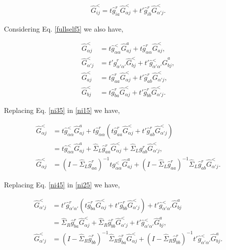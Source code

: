 \documentclass[10pt,prb,showpacs,amssymb,floatfix]{revtex4-1}
\newcommand{\nn}{\nonumber}
\newcommand{\alp}{\alpha}
\newcommand{\Sg}{\Sigma}
\newcommand{\h}{\hat}
\begin{document}
 
  \begin{align}
  \label{Fij5}
 \h G^<_{ij} =   t \h g^r_{ia} \h G^<_{\alp j}  +t' \h g^r_{ib}\h G^<_{\alp' j}. 
   \end{align}
 
Considering Eq. \eqref{fullself5} we also have,

  \begin{align}
  \label{ni15}
 \h G^<_{\alp j} &=   t \h g^<_{\alp\alp} \h{G}^a_{a j}  +t \h g^r_{\alp\alp}\h G^<_{a j}, \\
    \label{ni25}
   \h G^<_{\alp' j} &=   t' \h g^r_{\alp'\alp'} \h{G}^<_{b j}  +t' \h g^<_{\alp'\alp'}\h{G}^a_{b j}, \\
    \label{ni35}
    \h G^<_{a j} &=   t \h g^r_{a a} \h{G}^<_{\alp j}  +t' \h g^r_{a b}\h G^<_{\alp' j}, \\
      \label{ni45}
      \h G^<_{b j} &=   t \h g^r_{b a} \h{G}^<_{\alp j}  +t' \h g^r_{b b}\h G^<_{\alp' j}. 
   \end{align}
 
Replacing Eq. \eqref{ni35} in \eqref{ni15} we have,

\begin{align}
\label{ni55}
\h G^<_{\alp j} &=   t \h g^<_{\alp\alp} \h{G}^a_{a j}  +t \h g^r_{\alp\alp}(t \h g^r_{a a} \h{G}^<_{\alp j}  +t' \h g^r_{a b}\h G^<_{\alp' j}) \nn\\
&= t \h g^<_{\alp\alp} \h{G}^a_{a j}  + \h \Sg_{L} \h g^r_{a a} \h{G}^<_{\alp j}  +\h \Sg_{L} g^r_{a b}\h G^<_{\alp' j}, \nn\\
\h G^<_{\alp j} &= (I-\h \Sg_L \h g^r_{aa})^{-1} t g^<_{\alp\alp} \h{G}^a_{aj} + (I-\h \Sg_L \h g^r_{aa})^{-1} \h \Sg_L \h g^r_{ab} \h G^<_{\alp' j}.
\end{align}

Replacing Eq.  \eqref{ni45} in \eqref{ni25} we have,

\begin{align}
\label{ni65}
\h G^<_{\alp' j} &=   t' \h g^r_{\alp'\alp'} ( t \h g^r_{b a} \h{G}^<_{\alp j}  +t' \h g^r_{b b}\h G^<_{\alp' j} ) +t' \h g^<_{\alp'\alp'}\h{G}^a_{b j} \nn\\
&= \h \Sg_R  \h g^r_{b a} \h{G}^<_{\alp j} + \h \Sg_R  \h g^r_{b b}\h G^<_{\alp' j}+t' \h g^<_{\alp'\alp'}\h{G}^a_{b j}, \nn\\
\h G^<_{\alp' j} &= (I- \h \Sg_R  \h g^r_{b b})^{-1}\h \Sg_R  \h g^r_{b a} \h{G}^<_{\alp j} + (I- \h \Sg_R  \h g^r_{b b})^{-1}t' \h g^<_{\alp'\alp'}\h{G}^a_{b j}.
\end{align}
\end{document}
